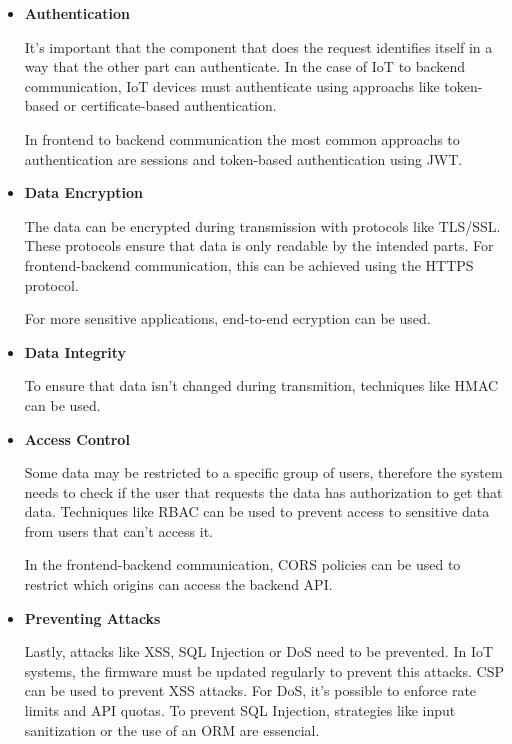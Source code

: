 \begin{itemize}

	\item \textbf{Authentication}

	      It's important that the component that does the request identifies itself
	      in a way that the other part can authenticate.
	      In the case of IoT to backend communication, IoT devices must authenticate
	      using approachs like token-based or certificate-based authentication.

	      In frontend to backend communication the most common approachs to
	      authentication are sessions and token-based authentication using JWT.

	\item \textbf{Data Encryption}

	      The data can be encrypted during transmission with protocols like TLS/SSL.
	      These protocols ensure that data is only readable by the intended parts.
	      For frontend-backend communication, this can be achieved using the HTTPS
	      protocol.

	      For more sensitive applications, end-to-end ecryption can be used.

	\item \textbf{Data Integrity}

	      To ensure that data isn't changed during transmition, techniques like
	      HMAC can be used.

	\item \textbf{Access Control}

	      Some data may be restricted to a specific group of users, therefore the
	      system needs to check if the user that requests the data has
	      authorization to get that data. Techniques like RBAC can be used to
	      prevent access to sensitive data from users that can't access it.

	      In the frontend-backend communication, CORS policies can be used to
	      restrict which origins can access the backend API.

	\item \textbf{Preventing Attacks}

	      Lastly, attacks like XSS, SQL Injection or DoS need to be prevented.
	      In IoT systems, the firmware must be updated regularly to prevent this
	      attacks.
	      CSP can be used to prevent XSS attacks. For DoS, it's possible to enforce
	      rate limits and API quotas. To prevent SQL Injection, strategies like
	      input sanitization or the use of an ORM are essencial.
\end{itemize}

